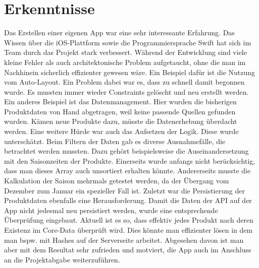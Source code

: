 \documentclass[12pt,titlepage]{article}
\begin{document}
\section*{Erkenntnisse}
Das Erstellen einer eigenen App war eine sehr interessante Erfahrung. Das Wissen über die iOS-Plattform sowie die Programmiersprache \glqq Swift\grqq{} hat sich im Team durch das Projekt stark verbessert. Während der Entwicklung sind viele kleine Fehler als auch architektonische Problem aufgetaucht, ohne die man im Nachhinein sicherlich effizienter gewesen wäre. Ein Beispiel dafür ist die Nutzung vom Auto-Layout. Ein Problem dabei war es, dass zu schnell damit begonnen wurde. Es mussten immer wieder Constraints gelöscht und neu erstellt werden. Ein anderes Beispiel ist das Datenmanagement. Hier wurden die bisherigen Produktdaten von Hand abgetragen, weil keine passende Quellen gefunden wurden. Kämen neue Produkte dazu, müsste die Datenerhebung überdacht werden. Eine weitere Hürde war auch das Aufsetzen der Logik. Diese wurde unterschätzt. Beim Filtern der Daten gab es diverse Ausnahmefälle, die betrachtet werden mussten. Dazu gehört beispielsweise die Auseinandersetzung mit den Saisonzeiten der Produkte. Einerseits wurde anfangs nicht berücksichtig, dass man dieses Array auch unsortiert erhalten könnte. Andererseits musste die Kalkulation der Saison mehrmals getestet werden, da der Übergang vom Dezember zum Januar ein spezieller Fall ist. Zuletzt war die Persistierung der Produktdaten ebenfalls eine Herausforderung. Damit die Daten der API auf der App nicht jedesmal neu persistiert werden, wurde eine entsprechende Überprüfung eingebaut. Aktuell ist es so, dass effektiv jedes Produkt nach deren Existenz im Core-Data überprüft wird. Dies könnte man effizienter lösen in dem man bspw. mit Hashes auf der Serverseite arbeitet. Abgesehen davon ist man aber mit dem Resultat sehr zufrieden und motviert, die App auch im Anschluss an die Projektabgabe weiterzuführen.
\end{document}
